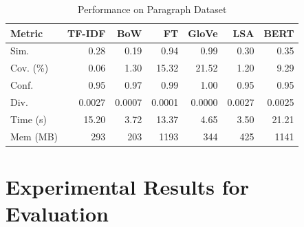 \documentclass[conference]{IEEEtran}
\begin{document}
\begin{table}[htbp]
\caption{Performance on Paragraph Dataset}
\centering
\begin{tabular}{|l|r|r|r|r|r|r|}
\hline
\textbf{Metric} & \textbf{TF-IDF} & \textbf{BoW} & \textbf{FT} & \textbf{GloVe} & \textbf{LSA} & \textbf{BERT} \\
\hline
Sim.      & 0.28 & 0.19 & 0.94 & 0.99 & 0.30 & 0.35 \\
Cov. (\%) & 0.06 & 1.30 & 15.32 & 21.52 & 1.20 & 9.29 \\
Conf.     & 0.95 & 0.97 & 0.99 & 1.00 & 0.95 & 0.95 \\
Div.      & 0.0027 & 0.0007 & 0.0001 & 0.0000 & 0.0027 & 0.0025 \\
Time (s)  & 15.20 & 3.72 & 13.37 & 4.65 & 3.50 & 21.21 \\
Mem (MB)  & 293 & 203 & 1193 & 344 & 425 & 1141 \\
\hline
\end{tabular}
\label{tab:para}
\end{table}



\section{Experimental Results for Evaluation}
\end{document}

